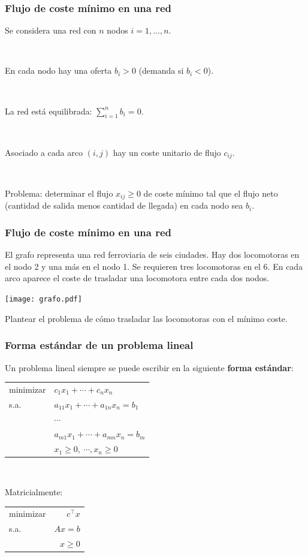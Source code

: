 \documentclass{beamer}
\begin{document}
\begin{frame}
\frametitle{Flujo de coste mínimo en una red}


Se considera una red con $n$ nodos $i=1,\ldots,n$.

\

En cada nodo hay una oferta $b_i>0$ (demanda si $b_i<0$).

\

La red está equilibrada: $\sum_{i=1}^n b_i=0$.

\

Asociado a cada arco $(i,j)$ hay un coste unitario de flujo $c_{ij}$.

\

Problema: determinar el flujo $x_{ij}\geq 0$ de coste mínimo tal  que el flujo neto (cantidad de salida menos cantidad de llegada) en cada nodo sea $b_i$. 


\end{frame}
\begin{frame}
\frametitle{Flujo de coste mínimo en una red}

El grafo representa una red ferroviaria de seis ciudades.
Hay dos locomotoras en el nodo 2 y una más en el nodo 1. Se requieren tres locomotoras en el 6. En cada arco aparece el coste de trasladar una locomotora entre cada dos nodos. 

\begin{center}
\texttt{[image: grafo.pdf]}
\end{center}

Plantear el problema de cómo trasladar las locomotoras con el mínimo coste.

\end{frame}
\begin{frame}
\frametitle{Forma estándar de un problema lineal}

Un problema lineal siempre se puede escribir en la siguiente \textbf{forma estándar}:
\begin{center}
\begin{tabular}{ll}
minimizar & $c_1x_1 +\cdots +  c_nx_n$ \\
s.a. & $a_{11}x_1+\cdots + a_{1n}x_n = b_1$    \\
	& $\cdots$	\\
	& $a_{m1}x_1+\cdots + a_{mn}x_n = b_m$    \\
	 & $x_1\geq 0,\ \cdots, x_n\geq 0$
\end{tabular}
\end{center}

\

Matricialmente:

\begin{center}
\begin{tabular}{lr}
minimizar & $c^\top x$ \\
s.a. & $Ax=b$   \\
	 & $x\geq 0$
\end{tabular}
\end{center}

\end{frame}
\end{document}
